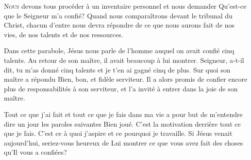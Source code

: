 


\lettrine{N}{ous} devons tous procéder à un inventaire personnel
 et nous demander\frcolon{} 
 \Og Qu'est-ce que le Seigneur m'a confié? \Fg{}
 Quand nous comparaîtrons devant le tribunal du Christ,
 chacun d'entre nous devra répondre de ce que nous aurons fait de nos vies,
 de nos talents et de nos ressources. 


Dans cette parabole, Jésus nous parle de l'homme auquel on avait confié
 cinq talents. Au retour de son maître, il avait beaucoup à lui montrer.
 \Og Seigneur, a-t-il dit, 
 tu m'as donné cinq talents et je t'en ai gagné cinq de plus. \Fg{}
 Sur quoi son maître a répondu\frcolon{} 
 \Og Bien, bon, et fidèle serviteur. \Fg{}
 Il a alors promis de confier encore plus de responsabilités à son serviteur,
 et l'a invité à entrer dans \Og la joie de son maître. \Fg{}

Tout ce que j'ai fait et tout ce que je fais dans ma vie
 a pour but de m'entendre dire un jour les paroles suivantes\frcolon{} 
 \Og Bien joué. \Fg{} 
 C'est la motivation derrière tout ce que je fais.
 C'est ce à quoi j'aspire et ce pourquoi je travaille.
 Si Jésus venait aujourd'hui, seriez-vous heureux de Lui montrer
 ce que vous avez fait des choses qu'Il vous a confiées? 

\dvrule






